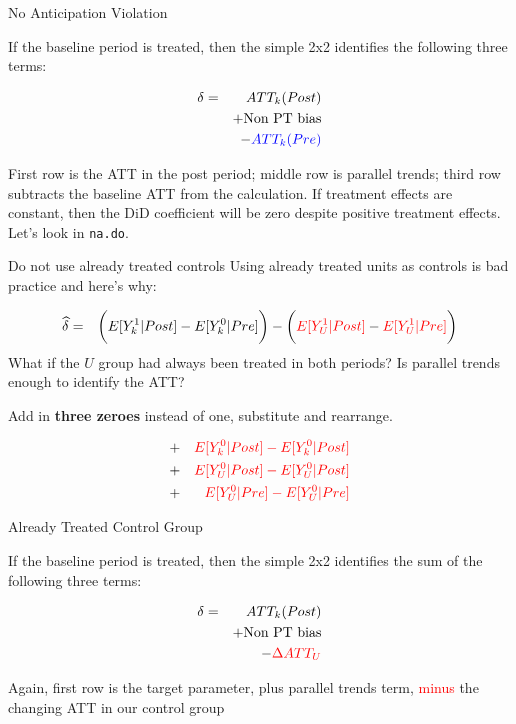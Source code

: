 \documentclass{beamer}
\begin{document}
\begin{frame}{No Anticipation Violation}

If the baseline period is treated, then the simple 2x2 identifies the following three terms:

\begin{eqnarray*}
\delta &=& ATT_k(Post) \\&&+ \text{Non PT bias} \\&&- \textcolor{blue}{ATT_k(Pre)}
\end{eqnarray*}

First row is the ATT in the post period; middle row is parallel trends; third row subtracts the baseline ATT from the calculation. If treatment effects are constant, then the DiD coefficient will be zero despite positive treatment effects.  Let's look in \texttt{na.do}.

\end{frame}

\begin{frame}{Do not use already treated controls}
Using already treated units as controls is bad practice and here's why:

\begin{eqnarray*}
\widehat{\delta} &=& \bigg ( E[Y^1_k|Post] - E[Y^0_k|Pre] \bigg ) - \bigg ( \textcolor{red}{E[Y^1_U | Post ]} - \textcolor{red}{E[ Y^1_U | Pre]} \bigg) \\
\end{eqnarray*}What if the $U$ group had always been treated in both periods? Is parallel trends enough to identify the ATT?

\bigskip

Add in \textbf{three zeroes} instead of one, substitute and rearrange.

\begin{eqnarray*}
&+& \textcolor{red}{E[Y^0_k|Post] - E[Y^0_k|Post]} \\
&+& \textcolor{red}{E[Y^0_U|Post] - E[Y^0_U|Post]}  \\
&+& \textcolor{red}{E[Y^0_U|Pre] - E[Y^0_U|Pre]}
\end{eqnarray*}

\end{frame}

\begin{frame}{Already Treated Control Group}

If the baseline period is treated, then the simple 2x2 identifies the sum of the following three terms:

\begin{eqnarray*}
\delta &=& ATT_k(Post) \\&&+ \text{Non PT bias} \\&&- \textcolor{red}{\Delta ATT_U}
\end{eqnarray*}

Again, first row is the target parameter, plus parallel trends term, \textcolor{red}{minus} the changing ATT in our control group

\end{frame}
\end{document}
